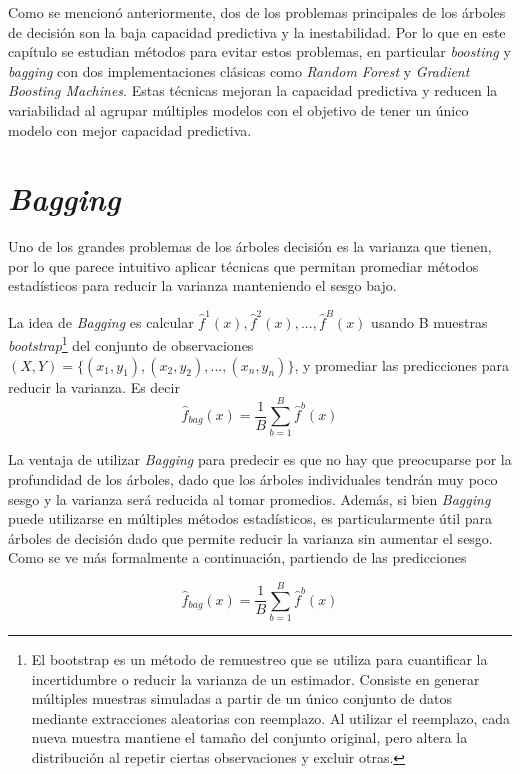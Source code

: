 Como se mencionó anteriormente, dos de los problemas principales de los árboles de decisión son la baja capacidad predictiva y la inestabilidad. Por lo que en este capítulo se estudian métodos para evitar estos problemas, en particular \textit{boosting} y \textit{bagging} con dos implementaciones clásicas como \textit{Random Forest} y \textit{Gradient Boosting Machines}. Estas técnicas mejoran la capacidad predictiva y reducen la variabilidad al agrupar múltiples modelos con el objetivo de tener un único modelo con mejor capacidad predictiva.

\section{\textit{Bagging}}

Uno de los grandes problemas de los árboles decisión es la varianza que tienen, por lo que parece intuitivo aplicar técnicas que permitan promediar métodos estadísticos para reducir la varianza manteniendo el sesgo bajo.

La idea de \textit{Bagging} \cite{Breiman1996} es calcular $\hat{f}^1(x),\hat{f}^2(x),...,\hat{f}^B(x)$ usando B muestras \textit{bootstrap}\footnote{El bootstrap es un método de remuestreo que se utiliza para cuantificar la incertidumbre o reducir la varianza de un estimador. Consiste en generar múltiples muestras simuladas a partir de un único conjunto de datos mediante extracciones aleatorias con reemplazo. Al utilizar el reemplazo, cada nueva muestra mantiene el tamaño del conjunto original, pero altera la distribución al repetir ciertas observaciones y excluir otras.} del conjunto de observaciones $(X,Y)=\{(x_1,y_1),(x_2,y_2),...,(x_n,y_n)\}$, y promediar las predicciones para reducir la varianza. Es decir
\begin{equation}
    \hat{f}_{bag}(x)=\frac{1}{B}\sum_{b=1}^{B}\hat{f}^b(x)
\end{equation}

La ventaja de utilizar \textit{Bagging} para predecir es que no hay que preocuparse por la profundidad de los árboles, dado que los árboles individuales tendrán muy poco sesgo y la varianza será reducida al tomar promedios. Además, si bien \textit{Bagging} puede utilizarse en múltiples métodos estadísticos, es particularmente útil para árboles de decisión dado que permite reducir la varianza sin aumentar el sesgo. Como se ve más formalmente a continuación, partiendo de las predicciones

\begin{equation}
    \hat{f}_{bag}(x)=\frac{1}{B}\sum_{b=1}^{B}\hat{f}^b(x)
\end{equation}

